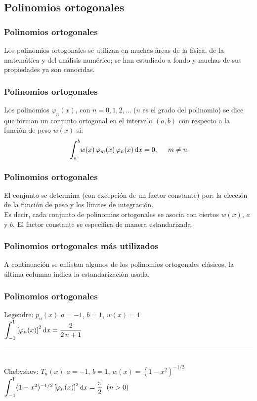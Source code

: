 \documentclass[12pt]{beamer}
\begin{document}
\subsection{Polinomios ortogonales}

\begin{frame}
\frametitle{Polinomios ortogonales}
Los polinomios ortogonales se utilizan en muchas áreas de la física, de la matemática y del análisis numérico; se han estudiado a fondo y muchas de sus propiedades ya son conocidas. 
\end{frame}
\begin{frame}
\frametitle{Polinomios ortogonales}
Los polinomios $\varphi_{n}(x)$, con $n = 0, 1, 2,\ldots$ ($n$ es el grado del polinomio) se dice que forman un conjunto ortogonal en el intervalo $(a, b)$ con respecto a la función de peso $w(x)$ si:
\pause
\begin{align*}
\scaleint{6ex}_{\bs a}^{b} w (x) \, \varphi_{m} (x) \, \varphi_{n} (x) \dd{x} = 0, \hspace{0.5cm} m \neq n
\end{align*}
\end{frame}
\begin{frame}
\frametitle{Polinomios ortogonales}
El conjunto se determina (con excepción de un factor constante) por: la elección de la función de peso y los límites de integración.
\\
\bigskip
\pause
Es decir, cada conjunto de polinomios ortogonales se asocia con ciertos $w(x)$, $a$ y $b$. \pause El factor constante se especifica de manera estandarizada.
\end{frame}
\begin{frame}
\frametitle{Polinomios ortogonales más utilizados}
A continuación se enlistan algunos de los polinomios ortogonales clásicos, la última columna indica la estandarización usada.
\end{frame}
\begin{frame}
\frametitle{Polinomios ortogonales}
Legendre: $p_{n} (x)$  \hspace{0.5cm} $a = -1$, $b = 1$, $w (x) = 1$ \\[0.5em]
$\scaleint{6ex}_{\bs -1}^{1} \left[ \varphi_{n} (x)\right]^{2} \dd{x} = \dfrac{2}{2 \, n + 1}$
\\[0.5em]
\rule{10cm}{1pt}
\\[0.5em]
Chebyshev: $T_{n} (x)$ \hspace{0.5cm} $a = -1$, $b = 1$, $w (x) = (1 - x^{2})^{-1/2}$ \\[0.5em]
$\scaleint{6ex}_{\bs -1}^{1} (1 - x^{2})^{-1/2} \left[ \varphi_{n} (x)\right]^{2} \dd{x} = \dfrac{\pi}{2} \hspace{0.2cm} (n > 0)$
\end{frame}
\end{document}
